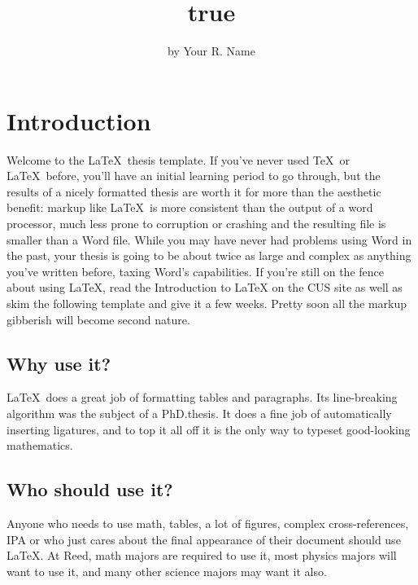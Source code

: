 \title{true}
\author{by Your R. Name}

\maketitle


\tableofcontents

\chapter*{Introduction}

Welcome to the \LaTeX~thesis template. If you've never used \TeX~or
\LaTeX~before, you'll have an initial learning period to go through, but
the results of a nicely formatted thesis are worth it for more than the
aesthetic benefit: markup like \LaTeX~is more consistent than the output
of a word processor, much less prone to corruption or crashing and the
resulting file is smaller than a Word file. While you may have never had
problems using Word in the past, your thesis is going to be about twice
as large and complex as anything you've written before, taxing Word's
capabilities. If you're still on the fence about using \LaTeX, read the
Introduction to LaTeX on the CUS site as well as skim the following
template and give it a few weeks. Pretty soon all the markup gibberish
will become second nature.

\section{Why use it?}

\LaTeX~does a great job of formatting tables and paragraphs. Its
line-breaking algorithm was the subject of a PhD.\thinspace thesis. It
does a fine job of automatically inserting ligatures, and to top it all
off it is the only way to typeset good-looking mathematics.

\section{Who should use it?}

Anyone who needs to use math, tables, a lot of figures, complex
cross-references, IPA or who just cares about the final appearance of
their document should use \LaTeX. At Reed, math majors are required to
use it, most physics majors will want to use it, and many other science
majors may want it also.

